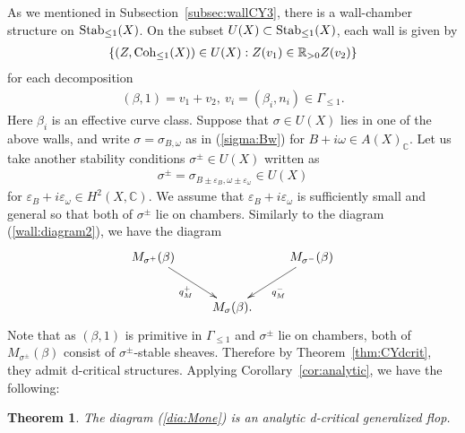 \documentclass[11pt]{amsart}
\theoremstyle{plain}
\newtheorem{thm}{Theorem}[section]
\theoremstyle{definition}
\theoremstyle{remark}
\newcommand{\Coh}{\mathop{\rm Coh}\nolimits}
\newcommand{\Stab}{\mathop{\rm Stab}\nolimits}
\begin{document}
As we mentioned in Subsection~\ref{subsec:wallCY3}, there 
is a 
wall-chamber structure on 
$\Stab_{\le 1}(X)$. 
On the subset $U(X) \subset \Stab_{\le 1}(X)$, 
each wall is given by
\begin{align}\notag
\{(Z, \Coh_{\le 1}(X)) \in U(X) : 
Z(v_1) \in \mathbb{R}_{>0} Z(v_2) \}
\end{align}
for each decomposition
\begin{align*}
(\beta, 1)=v_1+v_2, \ 
v_i=(\beta_i, n_i) \in \Gamma_{\le 1}.
\end{align*}
Here $\beta_i$ is an effective curve class. 
Suppose that 
$\sigma \in U(X)$ 
 lies in one of the above walls, 
and write $\sigma=\sigma_{B, \omega}$ as in (\ref{sigma:Bw})
 for $B+i\omega \in A(X)_{\mathbb{C}}$.
Let us take another stability conditions
$\sigma^{\pm} \in U(X)$ 
written as 
\begin{align}\label{spm}
\sigma^{\pm}=\sigma_{B \pm \varepsilon_B, \omega \pm \varepsilon_{\omega}} \in U(X)
\end{align}
for $\varepsilon_B +i \varepsilon_{\omega} \in H^2(X, \mathbb{C})$.
We assume that $\varepsilon_B +i \varepsilon_{\omega}$
is sufficiently small and 
general so that 
both of $\sigma^{\pm}$ lie on chambers. 
Similarly to the diagram (\ref{wall:diagram2}), we 
have the diagram
\begin{align}\label{dia:Mone}
\xymatrix{
M_{\sigma^{+}}(\beta) \ar[rd]_-{q_M^{+}} & & M_{\sigma^{-}}(\beta) 
\ar[ld]^-{q_M^{-}} \\
& M_{\sigma}(\beta). &
}
\end{align}
Note that as $(\beta, 1)$ is primitive in 
$\Gamma_{\le 1}$
and $\sigma^{\pm}$ lie on chambers, 
both of $M_{\sigma^{\pm}}(\beta)$
consist of $\sigma^{\pm}$-stable 
sheaves. Therefore by Theorem~\ref{thm:CYdcrit}, 
they 
admit d-critical structures.  
Applying Corollary~\ref{cor:analytic}, 
we have the following: 
\begin{thm}\label{thm:dflop:one}\label{thm:Dflop:one}
The diagram (\ref{dia:Mone})
is an analytic d-critical generalized flop. 
\end{thm}
\end{document}
